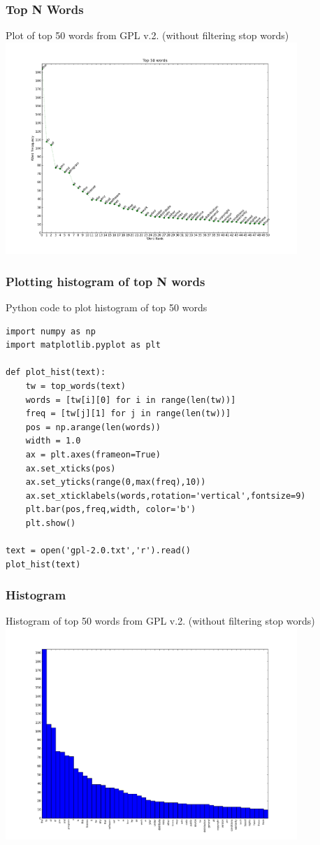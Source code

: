 \documentclass[serif,11pt,aspectratio=1610,table]{beamer}
\begin{document}
\begin{frame}
 \frametitle{Top N Words}
\small{Plot of top 50 words from GPL v.2. (without filtering stop words)} \\
\includegraphics[height=8cm]{freq_tag.png}
\end{frame}

\begin{frame}[fragile]
 \frametitle{Plotting histogram of top N words}
Python code to plot histogram of top 50 words
\footnotesize
\begin{verbatim}
import numpy as np
import matplotlib.pyplot as plt

def plot_hist(text):
    tw = top_words(text)
    words = [tw[i][0] for i in range(len(tw))]
    freq = [tw[j][1] for j in range(len(tw))]
    pos = np.arange(len(words))
    width = 1.0
    ax = plt.axes(frameon=True)
    ax.set_xticks(pos)
    ax.set_yticks(range(0,max(freq),10))
    ax.set_xticklabels(words,rotation='vertical',fontsize=9)
    plt.bar(pos,freq,width, color='b')
    plt.show()

text = open('gpl-2.0.txt','r').read()
plot_hist(text)
\end{verbatim}

\end{frame}


\begin{frame}
 \frametitle{Histogram}
\small{Histogram of top 50 words from GPL v.2. (without filtering stop words)} \\
\includegraphics[height=8cm]{histogram.png}
\end{frame}
\end{document}

